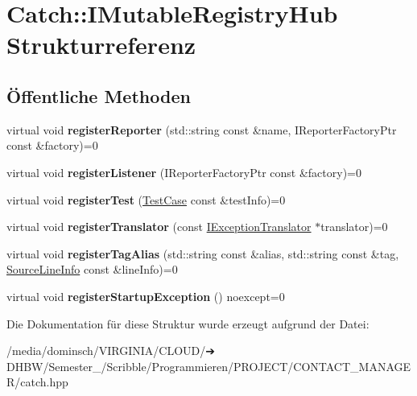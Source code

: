\hypertarget{structCatch_1_1IMutableRegistryHub}{}\section{Catch\+:\+:I\+Mutable\+Registry\+Hub Strukturreferenz}
\label{structCatch_1_1IMutableRegistryHub}
\subsection*{Öffentliche Methoden}
\begin{DoxyCompactItemize}
\item 
\mbox{\label{structCatch_1_1IMutableRegistryHub_a1c0ac202ac31ee9f88e8ff5cbac4b243}} 
virtual void {\bfseries register\+Reporter} (std\+::string const \&name, I\+Reporter\+Factory\+Ptr const \&factory)=0
\item 
\mbox{\label{structCatch_1_1IMutableRegistryHub_abd892a133f85581fd00ee75bb379ca56}} 
virtual void {\bfseries register\+Listener} (I\+Reporter\+Factory\+Ptr const \&factory)=0
\item 
\mbox{\label{structCatch_1_1IMutableRegistryHub_a11b85c6744d88c9f83fe16ad4a8dd451}} 
virtual void {\bfseries register\+Test} (\hyperlink{classCatch_1_1TestCase}{Test\+Case} const \&test\+Info)=0
\item 
\mbox{\label{structCatch_1_1IMutableRegistryHub_ae6825365102693cf7707db022a2c2b49}} 
virtual void {\bfseries register\+Translator} (const \hyperlink{structCatch_1_1IExceptionTranslator}{I\+Exception\+Translator} $\ast$translator)=0
\item 
\mbox{\label{structCatch_1_1IMutableRegistryHub_abf2e386b6f94f615719ada711adbf822}} 
virtual void {\bfseries register\+Tag\+Alias} (std\+::string const \&alias, std\+::string const \&tag, \hyperlink{structCatch_1_1SourceLineInfo}{Source\+Line\+Info} const \&line\+Info)=0
\item 
\mbox{\label{structCatch_1_1IMutableRegistryHub_a72a7d5386851ac3200f8da794a009c86}} 
virtual void {\bfseries register\+Startup\+Exception} () noexcept=0
\end{DoxyCompactItemize}


Die Dokumentation für diese Struktur wurde erzeugt aufgrund der Datei\+:\begin{DoxyCompactItemize}
\item 
/media/dominsch/\+V\+I\+R\+G\+I\+N\+I\+A/\+C\+L\+O\+U\+D/➔ D\+H\+B\+W/\+Semester\+\_/\+Scribble/\+Programmieren/\+P\+R\+O\+J\+E\+C\+T/\+C\+O\+N\+T\+A\+C\+T\+\_\+\+M\+A\+N\+A\+G\+E\+R/catch.\+hpp\end{DoxyCompactItemize}
